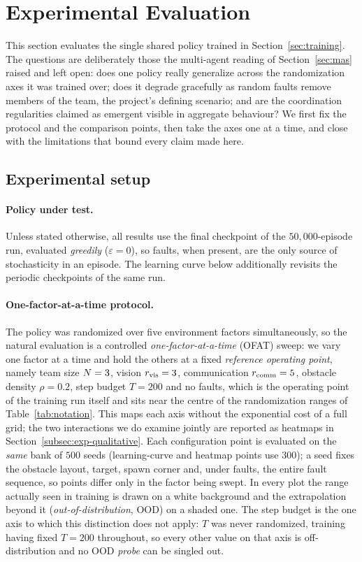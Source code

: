 \section{Experimental Evaluation}
\label{sec:experiments}

This section evaluates the single shared policy trained in
Section~\ref{sec:training}. The questions are deliberately those the multi-agent
reading of Section~\ref{sec:mas} raised and left open: does one policy really
generalize across the randomization axes it was trained over; does it degrade
gracefully as random faults remove members of the team, the project's defining
scenario; and are the coordination regularities claimed as emergent visible in
aggregate behaviour? We first fix the protocol and the comparison points, then
take the axes one at a time, and close with the limitations that bound every
claim made here.

\subsection{Experimental setup}
\label{subsec:exp-setup}

\paragraph{Policy under test.}
Unless stated otherwise, all results use the final checkpoint of the
$50{,}000$-episode run, evaluated \emph{greedily}
($\varepsilon = 0$), so faults, when present, are the only source of
stochasticity in an episode. The learning curve below additionally revisits the
periodic checkpoints of the same run.

\paragraph{One-factor-at-a-time protocol.}
The policy was randomized over five environment factors simultaneously, so the
natural evaluation is a controlled \emph{one-factor-at-a-time} (OFAT) sweep: we
vary one factor at a time and
hold the others at a fixed \emph{reference operating point}, namely team size
$N = 3$, vision $r_{\mathrm{vis}} = 3$, communication $r_{\mathrm{comm}} = 5$, obstacle density
$\rho = 0.2$, step budget $T = 200$ and no faults, which is the operating point
of the training run itself and sits near the centre of the randomization ranges
of Table~\ref{tab:notation}. This maps each axis without the
exponential cost of a full grid; the two interactions we do examine jointly are
reported as heatmaps in Section~\ref{subsec:exp-qualitative}. Each configuration
point is evaluated on the \emph{same} bank of $500$ seeds (learning-curve and
heatmap points use $300$); a seed fixes the obstacle layout, target, spawn corner
and, under faults, the entire fault sequence, so points differ only in the factor
being swept. In every plot the range actually seen in training is drawn on a
white background and the extrapolation beyond it (\emph{out-of-distribution},
OOD) on a shaded one. The step budget is the one axis to which this
distinction does not apply: $T$ was never randomized, training having fixed
$T = 200$ throughout, so every other value on that axis is off-distribution and
no OOD \emph{probe} can be singled out.

